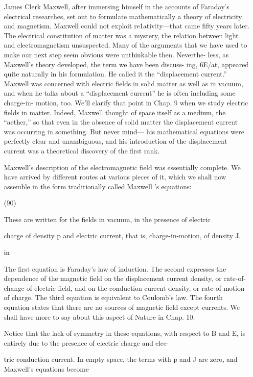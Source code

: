 James Clerk Maxwell, after immersing himself in the accounts of
Faraday's electrical researches, set out to formulate mathematically
a theory of electricity and magnetism. Maxwell could not exploit
re1ativity---that came fifty years later. The electrical constitution
of matter was a mystery, the relation between light and electromagnetism
unsuspected. Many of the arguments that we have used to
make our next step seem obvious were unthinkable then. Neverthe-
less, as Maxwell's theory developed, the term we have been discuss-
ing, 6E/at, appeared quite naturally in his formulation. He called
it the ``displacement current.'' Maxwell was concerned with electric
fields in solid matter as well as in vacuum, and when he talks about
a ``displacement current'' he is often including some charge-in-
motion, too. We'll clarify that point in Chap. 9 when we study electric
fields in matter. Indeed, Maxwell thought of space itself as a
medium, the ``aether,'' so that even in the absence of solid matter the
displacement current was occurring in something. But never mind---
his mathematical equations were perfectly clear and unambiguous,
and his introduction of the displacement current was a theoretical
discovery of the first rank. 

Maxwell's description of the electromagnetic field was essentially
complete. We have arrived by different routes at various pieces of it,
which we shall now assemble in the form traditionally called
Maxwell 's equations:

(90)

 

These are written for the fields in vacuum, in the presence of electric

charge of density p and electric current, that is, charge-in-motion,
of density J.

in

The first equation is Faraday's law of induction. The second
expresses the dependence of the magnetic field on the displacement
current density, or rate-of-change of electric field, and on the conduction
current density, or rate-of-motion of charge. The third
equation is equivalent to Coulomb's law. The fourth equation states
that there are no sources of magnetic field except currents. We shall
have more to say about this aspect of Nature in Chap. 10.

Notice that the lack of symmetry in these equations, with respect
to B and E, is entirely due to the presence of electric charge and elec-

tric conduction current. In empty space, the terms with p and J are
zero, and Maxwell's equations become

